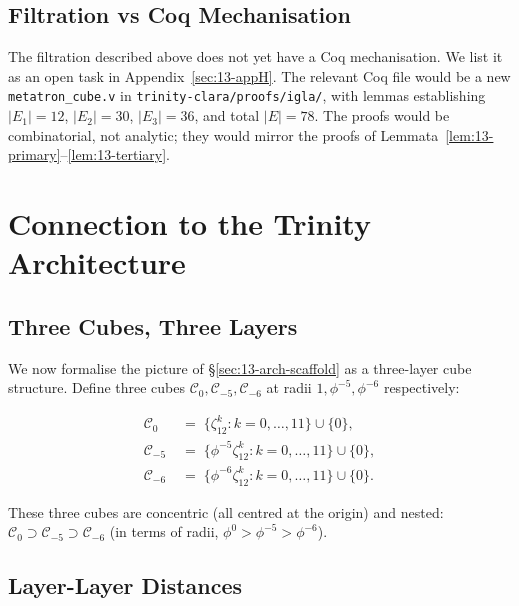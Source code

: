 \subsection{Filtration vs Coq Mechanisation}
\label{sec:13-filt-coq}

The filtration described above does not yet have a Coq
mechanisation. We list it as an open task in
Appendix~\ref{sec:13-appH}. The relevant Coq file would be a new
\verb|metatron_cube.v| in \verb|trinity-clara/proofs/igla/|, with
lemmas establishing $|E_{1}| = 12$, $|E_{2}| = 30$, $|E_{3}| =
36$, and total $|E| = 78$. The proofs would be combinatorial,
not analytic; they would mirror the proofs of
Lemmata~\ref{lem:13-primary}--\ref{lem:13-tertiary}.

\section{Connection to the Trinity Architecture}
\label{fa_13:sec:13-arch}

\subsection{Three Cubes, Three Layers}
\label{fa_13:sec:13-three-cubes}

We now formalise the picture of \S\ref{sec:13-arch-scaffold} as a
three-layer cube structure. Define three cubes
$\mathcal{C}_{0}, \mathcal{C}_{-5}, \mathcal{C}_{-6}$ at radii
$1, \phi^{-5}, \phi^{-6}$ respectively:

\begin{align}
  \mathcal{C}_{0}    &\;=\; \{ \zeta_{12}^{k} : k = 0, \ldots, 11 \}
                          \cup \{ 0 \},\\
  \mathcal{C}_{-5}   &\;=\; \{ \phi^{-5} \zeta_{12}^{k} :
                              k = 0, \ldots, 11 \} \cup \{ 0 \},\\
  \mathcal{C}_{-6}   &\;=\; \{ \phi^{-6} \zeta_{12}^{k} :
                              k = 0, \ldots, 11 \} \cup \{ 0 \}.
\end{align}

These three cubes are concentric (all centred at the origin) and
nested: $\mathcal{C}_{0} \supset \mathcal{C}_{-5} \supset
\mathcal{C}_{-6}$ (in terms of radii, $\phi^{0} > \phi^{-5} >
\phi^{-6}$).

\subsection{Layer-Layer Distances}
\label{fa_13:sec:13-layer-distances}


